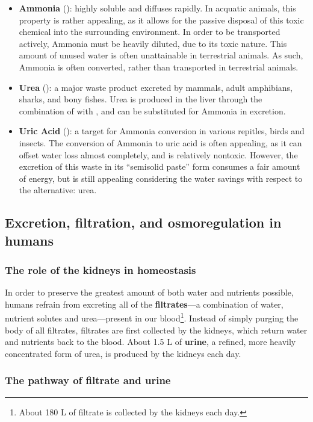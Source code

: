 \documentclass{article}
\begin{document}
\begin{itemize}
	\item \textbf{Ammonia} (): highly soluble and diffuses rapidly. In
		acquatic animals, this property is rather appealing, as it allows for
		the passive disposal of this toxic chemical into the surrounding
		environment. In order to be transported actively, Ammonia must be
		heavily diluted, due to its toxic nature. This amount of unused water
		is often unattainable in terrestrial animals. As such, Ammonia is often
		converted, rather than transported in terrestrial animals.
	\item \textbf{Urea} (): a major waste product excreted by mammals,
		adult amphibians, sharks, and bony fishes. Urea is produced in the liver
		through the combination of  with , and can be
		substituted for Ammonia in excretion.
	\item \textbf{Uric Acid} (): a target for Ammonia conversion
		in various repitles, birds and insects. The conversion of Ammonia to
		uric acid is often appealing, as it can offset water loss almost
		completely, and is relatively nontoxic. However, the excretion of this
		waste in its ``semisolid paste'' form consumes a fair amount of energy,
		but is still appealing considering the water savings with respect to
		the alternative: urea.
\end{itemize}

\subsection{Excretion, filtration, and osmoregulation in humans}

\subsubsection{The role of the kidneys in homeostasis}

In order to preserve the greatest amount of both water and nutrients possible,
humans refrain from excreting all of the \textbf{filtrates}---a combination of
water, nutrient solutes and urea---present in our blood\footnote{About 180 L of
filtrate is collected by the kidneys each day.}. Instead of simply purging the
body of all filtrates, filtrates are first collected by the kidneys, which
return water and nutrients back to the blood. About 1.5 L of \textbf{urine},
a refined, more heavily concentrated form of urea, is produced by the kidneys
each day.

\subsubsection{The pathway of filtrate and urine}
\end{document}
